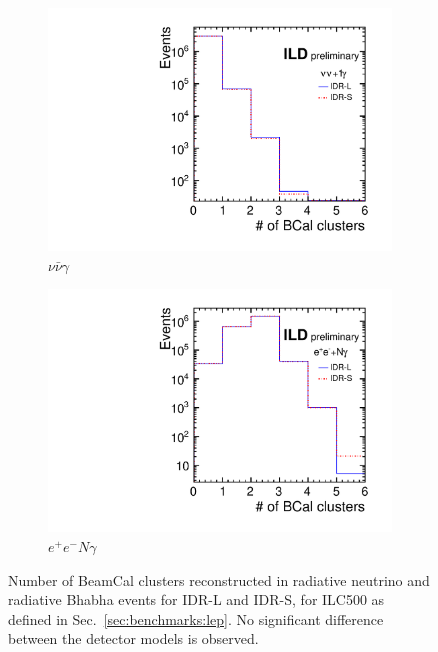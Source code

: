 \begin{figure}[htbp]
\begin{subfigure}{0.49\hsize} 
\includegraphics[width=\textwidth]{Performance/fig/bcalveto_vv1g_comp.pdf}
 \caption{$\nu\bar{\nu}\gamma$ \label{fig:WIMP:BCal:IDR-L}}
 \end{subfigure}
\begin{subfigure}{0.49\hsize} 
\includegraphics[width=\textwidth]{Performance/fig/bcalveto_eeNg_comp.pdf}
\caption{$e^+e^- N\gamma$ \label{fig:WIMP:BCal:IDR-S}}
 \end{subfigure}
\caption{Number of BeamCal clusters reconstructed in radiative neutrino and radiative Bhabha events for IDR-L and IDR-S, for ILC500 as defined in Sec.~\ref{sec:benchmarks:lep}. No significant difference between the detector models is observed.
}
\label{fig:WIMP:BCal}
\end{figure}

